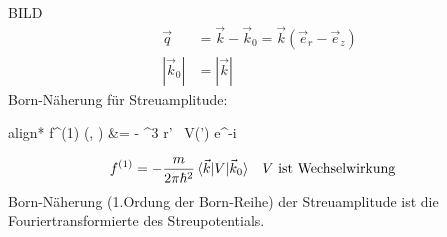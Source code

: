 	BILD
		\begin{align*}
			\vec{q} &= \vec{k} - \vec{k}_0 = \vec{k} (\vec{e}_r - \vec{e}_z) \\
			|\vec{k}_0| &= |\vec{k}|
		\end{align*}
	Born-Näherung für Streuamplitude:
		\begin{empheq}[box=\boxed]{align*}
			f^{(1)} (\Theta, \phi) &= - 
			\int \diff^3 r' ~V(') e^{-i  }
		\end{empheq}
		\begin{align*}
			f^{(1)} &= -\frac{m}{2 \pi \hbar^2}  \braket{\vec{k}| V | \vec{k}_0}
			& &V \text{ ist Wechselwirkung}
		\end{align*}
	Born-Näherung (1.Ordung der Born-Reihe) der Streuamplitude ist die Fouriertransformierte des Streupotentials.
		